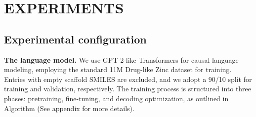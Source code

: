 



\section{EXPERIMENTS}\label{experiments}


\subsection{Experimental configuration}\label{exp_config}

{\textbf{The language model.} We use GPT-2-like Transformers for causal language modeling, employing the standard 11M Drug-like Zinc dataset for training. Entries with empty scaffold SMILES are excluded, and we adopt a 90/10 split for training and validation, respectively. The training process is structured into three phases: pretraining, fine-tuning, and decoding optimization, as outlined in Algorithm \algname (See appendix for more details).}






